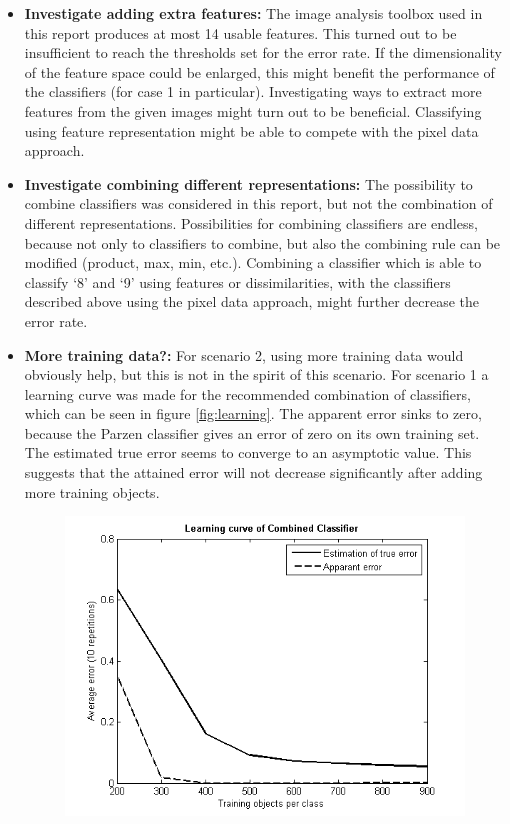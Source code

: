 \begin{itemize}
	\item \textbf{Investigate adding extra features:} The image analysis toolbox used in this report produces at most 14 usable features. This turned out to be insufficient to reach the thresholds set for the error rate. If the dimensionality of the feature space could be enlarged, this might benefit the performance of the classifiers (for case 1 in particular). Investigating ways to extract more features from the given images might turn out to be beneficial. Classifying using feature representation might be able to compete with the pixel data approach.
	\item \textbf{Investigate combining different representations:} The possibility to combine classifiers was considered in this report, but not the combination of different representations. Possibilities for combining classifiers are endless, because not only to classifiers to combine, but also the combining rule can be modified (product, max, min, etc.). Combining a classifier which is able to classify ‘8’ and ‘9’ using features or dissimilarities, with the classifiers described above using the pixel data approach, might further decrease the error rate. 
	\item \textbf{More training data?:} For scenario 2, using more training data would obviously help, but this is not in the spirit of this scenario. For scenario 1 a learning curve was made for the recommended combination of classifiers, which can be seen in figure \ref{fig:learning}. The apparent error sinks to zero, because the Parzen classifier gives an error of zero on its own training set. The estimated true error seems to converge to an asymptotic value. This suggests that the attained error will not decrease significantly after adding more training objects.
\begin{figure}[H]
	\centering
	\includegraphics[scale=0.8]{images/pr_figure_5.png}

\end{figure}
\end{itemize}
